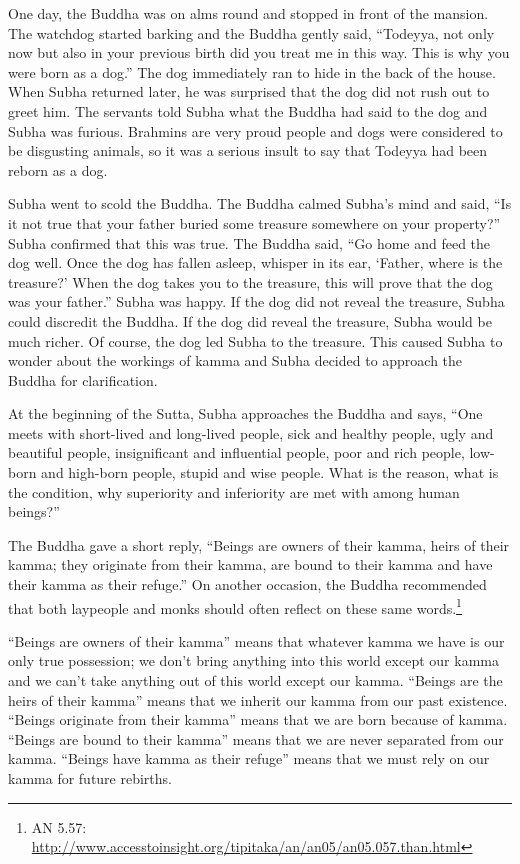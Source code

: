 One day, the Buddha was on alms round and stopped in front of the mansion. The watchdog started barking and the Buddha gently said, “Todeyya, not only now but also in your previous birth did you treat me in this way. This is why you were born as a dog.” The dog immediately ran to hide in the back of the house. When Subha returned later, he was surprised that the dog did not rush out to greet him. The servants told Subha what the Buddha had said to the dog and Subha was furious. Brahmins are very proud people and dogs were considered to be disgusting animals, so it was a serious insult to say that Todeyya had been reborn as a dog.

Subha went to scold the Buddha. The Buddha calmed Subha’s mind and said, “Is it not true that your father buried some treasure somewhere on your property?” Subha confirmed that this was true. The Buddha said, “Go home and feed the dog well. Once the dog has fallen asleep, whisper in its ear, ‘Father, where is the treasure?’ When the dog takes you to the treasure, this will prove that the dog was your father.” Subha was happy. If the dog did not reveal the treasure, Subha could discredit the Buddha. If the dog did reveal the treasure, Subha would be much richer. Of course, the dog led Subha to the treasure. This caused Subha to wonder about the workings of kamma and Subha decided to approach the Buddha for clarification.

At the beginning of the Sutta, Subha approaches the Buddha and says, “One meets with short-lived and long-lived people, sick and healthy people, ugly and beautiful people, insignificant and influential people, poor and rich people, low-born and high-born people, stupid and wise people. What is the reason, what is the condition, why superiority and inferiority are met with among human beings?”

The Buddha gave a short reply, “Beings are owners of their kamma, heirs of their kamma; they originate from their kamma, are bound to their kamma and have their kamma as their refuge.” On another occasion, the Buddha recommended that both laypeople and monks should often reflect on these same words.\footnote{AN 5.57: \url{http://www.accesstoinsight.org/tipitaka/an/an05/an05.057.than.html}}

“Beings are owners of their kamma” means that whatever kamma we have is our only true possession; we don’t bring anything into this world except our kamma and we can’t take anything out of this world except our kamma. “Beings are the heirs of their kamma” means that we inherit our kamma from our past existence. “Beings originate from their kamma” means that we are born because of kamma. “Beings are bound to their kamma” means that we are never separated from our kamma. “Beings have kamma as their refuge” means that we must rely on our kamma for future rebirths.

